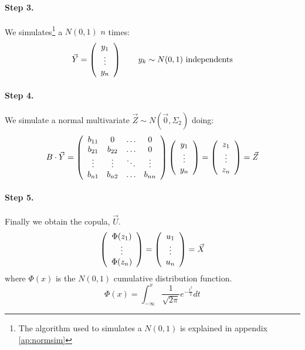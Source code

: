 \documentclass[a4paper,12pt,final]{article}
\begin{document}
\paragraph{Step 3.} We simulates\footnote{The algorithm used to simulates a $N(0,1)$
is explained in appendix \ref{ap:normsim}} a $N(0,1)$ $n$ times:
\begin{displaymath}
\vec{Y} =
\left(
\begin{array}{c}
y_1 \cr
\vdots \cr
y_n
\end{array}
\right) 
\qquad y_k \sim N(0,1) \textrm{ independents}
\end{displaymath}

\paragraph{Step 4.} We simulate a normal multivariate $\vec{Z} \sim N(\vec{0}, \Sigma_2)$ 
doing:
\begin{displaymath}
B \cdot \vec{Y} 
=
\left(
\begin{array}{cccc}
b_{11}   & 0        & \ldots & 0       \cr
b_{21}   & b_{22}   & \ldots & 0       \cr
\vdots  & \vdots  & \ddots & \vdots \cr
b_{n1}   & b_{n2}   & \ldots & b_{nn}
\end{array}
\right)
\left(
\begin{array}{c}
y_1 \cr
\vdots \cr
y_n
\end{array}
\right) 
=
\left(
\begin{array}{c}
z_1 \cr
\vdots \cr
z_n
\end{array}
\right) 
= 
\vec{Z}
\end{displaymath}

\paragraph{Step 5.} Finally we obtain the copula, $\vec{U}$.
\begin{displaymath}
\left(
\begin{array}{c}
\Phi(z_1) \cr
\vdots \cr
\Phi(z_n)
\end{array}
\right) 
=
\left(
\begin{array}{c}
u_1 \cr
\vdots \cr
u_n
\end{array}
\right) 
=
\vec{X} 
\end{displaymath}
where $\Phi(x)$ is the $N(0,1)$ cumulative distribution function.
\begin{displaymath}
\Phi(x) = \int_{-\infty}^{x} \frac{1}{\sqrt{2 \pi}} e^{-\frac{t^2}{2}} dt
\end{displaymath}
\end{document}
